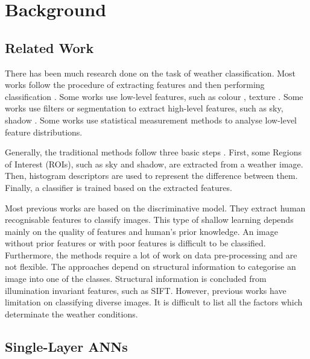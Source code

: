 
\chapter{Background} %
\label{Chapter2}

\section{Related Work}

There has been much research done on the task of weather classification. Most works follow the procedure of extracting features and then performing classification \citep{bishop1995neural,roser2008classification,serrano2002computationally,gokalp2007scene}.
Some works use low-level features, such as colour \citep{szummer1998indoor}, texture \citep{shotton2009textonboost,vailaya2002automatic}. Some works use filters or segmentation \citep{boutell2004learning,shotton2009textonboost} to extract high-level features, such as sky, shadow \citep{lutwo}. Some works use statistical measurement methods \citep{he2014spatial,roser2008classification} to analyse low-level feature distributions.

Generally, the traditional methods follow three basic steps \citep{roser2008classification,yan2009weather}. First, some Regions of Interest (ROIs), such as sky and shadow,  are extracted from a weather image. Then, histogram descriptors are used to represent the difference between them. Finally, a classifier is trained based on the extracted features. 

Most previous works are based on the discriminative model. They extract human recognisable features to classify images. This type of shallow learning depends mainly on the quality of features and human's prior knowledge. An image without prior features or with poor features is difficult to be classified. Furthermore, the methods require a lot of work on data pre-processing and are not flexible. The approaches depend on structural information to categorise an image into one of the classes. Structural information is concluded from illumination invariant features, such as SIFT. However, previous works have limitation on classifying diverse images. It is difficult to list all the factors which determinate the weather conditions.

\section{Single-Layer ANNs}


